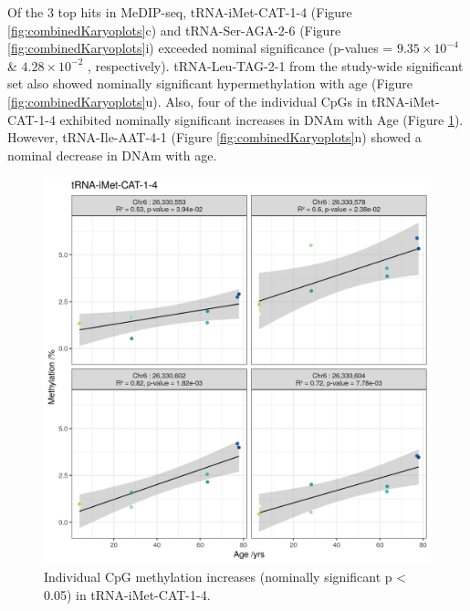 \documentclass[
]{book}
\begin{document}
Of the 3 top hits in MeDIP-seq, tRNA-iMet-CAT-1-4 (Figure \ref{fig:combinedKaryoplots}c) and tRNA-Ser-AGA-2-6 (Figure \ref{fig:combinedKaryoplots}i) exceeded nominal significance (p-values = \(9.35\times10^{-4}\) \& \(4.28\times10^{-2}\) , respectively).
tRNA-Leu-TAG-2-1 from the study-wide significant set also showed nominally significant hypermethylation with age (Figure \ref{fig:combinedKaryoplots}u).
Also, four of the individual CpGs in tRNA-iMet-CAT-1-4 exhibited nominally significant increases in DNAm with Age (Figure \ref{fig:tRNAiMetCAT1x4nomSigCpG}).
However, tRNA-Ile-AAT-4-1 (Figure \ref{fig:combinedKaryoplots}n) showed a nominal decrease in DNAm with age.

\begin{figure}

{\centering \includegraphics[width=0.8\linewidth]{./figs/tRNA-iMet-CAT-1-4_nomSig_CpG} 

}

\caption{Individual CpG methylation increases (nominally significant p \textless{} 0.05) in tRNA-iMet-CAT-1-4.}\label{fig:tRNAiMetCAT1x4nomSigCpG}
\end{figure}



\newpage
\end{document}
